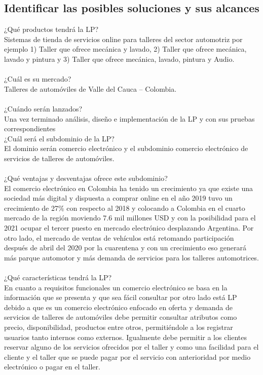 \documentclass[10pt,a4paper,openany]{book}
\begin{document}
\subsection{Identificar las posibles soluciones y sus alcances}
 
¿Qué productos tendrá la LP?\\
Sistemas de tienda de servicios online para talleres del sector automotriz por ejemplo 1) Taller que ofrece mecánica y lavado, 2) Taller que ofrece mecánica, lavado y pintura y 3) Taller que ofrece mecánica, lavado, pintura y Audio.\\\\
 ¿Cuál es su mercado?\\
Talleres de automóviles de Valle del Cauca – Colombia.\\\\
¿Cuándo serán lanzados?\\
Una vez terminado análisis, diseño e implementación de la LP y con sus pruebas correspondientes\\
¿Cuál será el subdominio de la LP?\\
El dominio serán comercio electrónico y el subdominio comercio electrónico de servicios de talleres de automóviles.\\\\
¿Qué ventajas y desventajas ofrece este subdominio?\\
El comercio electrónico en Colombia ha tenido un crecimiento ya que existe una sociedad más digital y dispuesta a comprar online en el año 2019 tuvo un crecimiento de 27\% con respecto al 2018 y colocando a Colombia en el cuarto mercado de la región moviendo 7.6 mil millones USD y con la posibilidad para el 2021 ocupar el tercer puesto en mercado electrónico desplazando Argentina. Por otro lado, el mercado de ventas de vehículos está retomando participación después de abril del 2020 por la cuarentena y con un crecimiento eso generará más parque automotor y más demanda de servicios para los talleres automotrices.\\\\
¿Qué características tendrá la LP?\\
En cuanto a requisitos funcionales un comercio electrónico se basa en la información que se presenta y que sea fácil consultar por otro lado está LP debido a que es un comercio electrónico enfocado en oferta y demanda de servicios de talleres de automóviles debe permitir consultar atributos como precio, disponibilidad, productos entre otros, permitiéndole a los registrar usuarios tanto internos como externos. Igualmente debe permitir a los clientes reservar alguno de los servicios ofrecidos por el taller   y como una facilidad para el cliente y el taller que se puede pagar por el servicio con anterioridad por medio electrónico o pagar en el taller.\\
\end{document}
